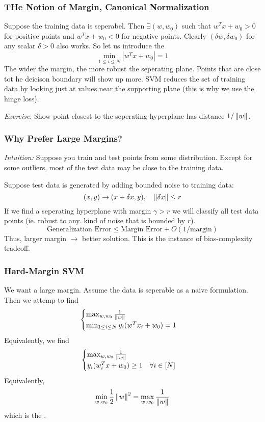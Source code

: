 \documentclass[11pt]{scrartcl}
\begin{document}
\subsubsection{THe Notion of Margin, Canonical Normalization}
Suppose the training data is seperabel. Then $\exists(w,w_0)$ such that $w^{T}x+w_0>0$ for positive points and $w^{T}x+w_0<0$ for negative points. Clearly $(\delta{w},\delta{w_0})$ for any scalar $\delta>0$ also works. So let us introduce the  $$\min_{1 \le i \le N} |w^{T}x+w_0|=1$$ The wider the margin, the more robust the seperating plane. Points that are close tot he deicison boundary will show up more. SVM reduces the set of training data by looking just at values near the supporting plane (this is why we use the hinge loss). 

\textit{Exercise}: Show point closest to the seperating hyperplane has distance $1/\left\lVert w\right\rVert$.

\subsubsection{Why Prefer Large Margins?}
\textit{Intuition:} Suppose you train and test points from some distribution. Except for some outliers, most of the test data may be close to the training data. 

Suppose test data is  generated by adding bounded noise to training data: $$(x,y) \to (x+\delta{x},y), \quad \left\lVert\delta{x}\right\rVert \le r$$ 
If we find a seperating hyperplane with margin $\gamma>r$ we will classify all test data points (ie. robust to any. kind of noise that is bounded by $r$). 
$$\text{Generalization Error} \le \text{Margin Error} + O(1/\text{margin})$$
Thus, larger margin $\to$ better solution. This is the instance of bias-complexity tradeoff.

\subsubsection{Hard-Margin SVM}
We want a large margin. Assume the data is seperable as a naive formulation. Then we attemp to find $$\begin{cases} \max_{w,w_0}\frac{1}{\left\lVert w\right\rVert} \\
\min_{1 \le i \le N} y_i(w^{T}x_i+w_0)=1
\end{cases}$$
Equivalently, we find $$\begin{cases} \max_{w,w_0} \frac{1}{\left\lVert w\right\rVert} \\ y_i(w_{i}^Tx+w_0) \ge 1 \quad \forall{i} \in [N] \end{cases}$$
Equivalently, $$\min_{w,w_0}\frac{1}{2}\left\lVert w\right\rVert^2=\max_{w,w_0}\frac{1}{\left\lVert w\right\rVert}$$
which is the .
\end{document}
